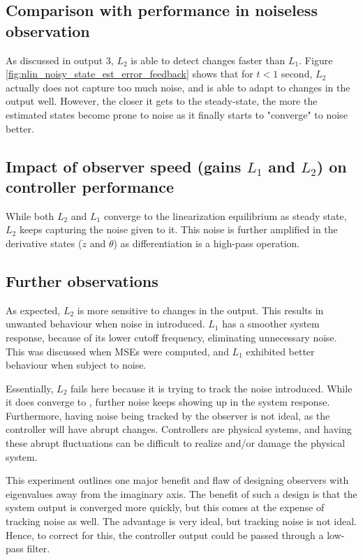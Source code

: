 \documentclass[10pt]{article}
\begin{document}
\subsection{Comparison with performance in noiseless observation}
As discussed in output 3, $L_2$ is able to detect changes faster than $L_1$. Figure \ref{fig:nlin_noisy_state_est_error_feedback} shows that for $t < 1$ second, $L_2$ actually does not capture too much noise, and is able to adapt to changes in the output well. However, the closer it gets to the steady-state, the more the estimated states become prone to noise as it finally starts to "converge" to noise better.

\subsection{Impact of observer speed (gains \texorpdfstring{$L_1$}{L1} and \texorpdfstring{$L_2$}{L2}) on controller performance}
While both $L_2$ and $L_1$ converge to the linearization equilibrium as steady state, $L_2$ keeps capturing the noise given to it. This noise is further amplified in the derivative states ($\dot{z}$ and $\dot{\theta}$) as differentiation is a high-pass operation.

\subsection{Further observations}
As expected, $L_2$ is more sensitive to changes in the output. This results in unwanted behaviour when noise in introduced. $L_1$ has a smoother system response, because of its lower cutoff frequency, eliminating unnecessary noise. This was discussed when MSEs were computed, and $L_1$ exhibited better behaviour when subject to noise. 

Essentially, $L_2$ fails here because it is trying to track the noise introduced. While it does converge to , further noise keeps showing up in the system response. Furthermore, having noise being tracked by the observer is not ideal, as the controller will have abrupt changes. Controllers are physical systems, and having these abrupt fluctuations can be difficult to realize and/or damage the physical system. 

This experiment outlines one major benefit and flaw of designing observers with eigenvalues away from the imaginary axis. The benefit of such a design is that the system output is converged more quickly, but this comes at the expense of tracking noise as well. The advantage is very ideal, but tracking noise is not ideal. Hence, to correct for this, the controller output could be passed through a low-pass filter.
\end{document}
